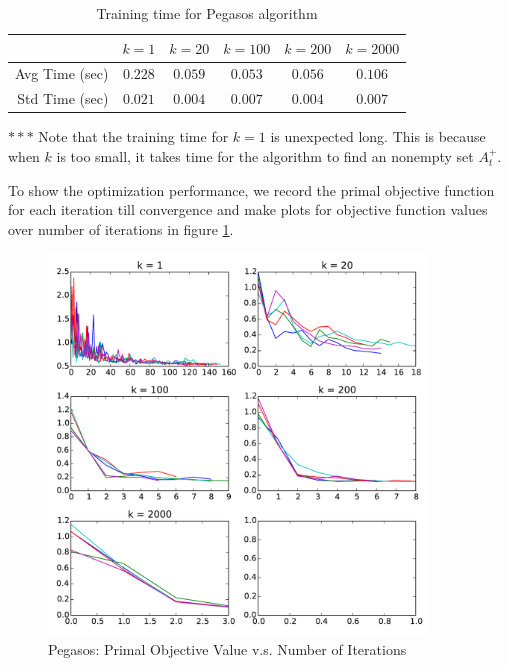 \documentclass[12pt,oneside,a4paper]{article}
\begin{document}
\begin{table}[ht!]
\centering
\caption{Training time for Pegasos algorithm}
\begin{tabular}{rccccc}
\toprule
 \multicolumn{1}{c}{  } & \multicolumn{1}{c}{ $k = 1$ } & \multicolumn{1}{c}{ $k = 20$ } & \multicolumn{1}{c}{ $k = 100$ } & \multicolumn{1}{c}{ $k = 200$ } & \multicolumn{1}{c}{ $k = 2000$ } \\
\midrule
 Avg Time (sec) & $0.228$ & $0.059$ & $0.053$ & $0.056$ & $0.106$ \\
 Std Time (sec) & $0.021$ & $0.004$ & $0.007$ & $0.004$ & $0.007$ \\
\bottomrule
\end{tabular}
\label{sgd}
\end{table}

$***$ Note that the training time for $k = 1$ is unexpected long. This is because when $k$ is too small, it takes time for the algorithm to find an nonempty set $A_{t}^{+}$.

To show the optimization performance, we record the primal objective function for each iteration till convergence and make plots for objective function values over number of iterations in figure \ref{fig:sgd}.

\begin{figure}[ht!]
    \centering
    \includegraphics[width=0.9\textwidth]{./figure/sgd.pdf}
    \caption{Pegasos: Primal Objective Value v.s. Number of Iterations}
    \label{fig:sgd}
\end{figure}
\end{document}
